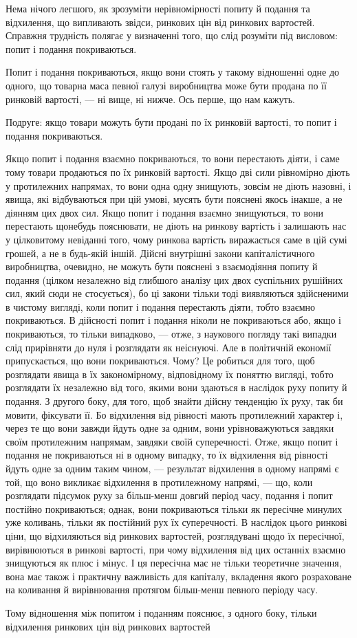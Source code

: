Нема нічого легшого, як зрозуміти нерівномірності попиту
й подання та відхилення, що випливають звідси, ринкових цін
від ринкових вартостей. Справжня трудність полягає у визначенні
того, що слід розуміти під висловом: попит і подання
покриваються.

Попит і подання покриваються, якщо вони стоять у такому
відношенні одне до одного, що товарна маса певної галузі виробництва
може бути продана по її ринковій вартості, — ні вище,
ні нижче. Ось перше, що нам кажуть.

Подруге: якщо товари можуть бути продані по їх ринковій
вартості, то попит і подання покриваються.

Якщо попит і подання взаємно покриваються, то вони перестають
діяти, і саме тому товари продаються по їх ринковій вартості.
Якщо дві сили рівномірно діють у протилежних напрямах,
то вони одна одну знищують, зовсім не діють назовні, і явища,
які відбуваються при цій умові, мусять бути пояснені якось
інакше, а не діянням цих двох сил. Якщо попит і подання взаємно
знищуються, то вони перестають щонебудь пояснювати,
не діють на ринкову вартість і залишають нас у цілковитому
невіданні того, чому ринкова вартість виражається саме в цій
сумі грошей, а не в будь-якій іншій. Дійсні внутрішні закони
капіталістичного виробництва, очевидно, не можуть бути пояснені
з взаємодіяння попиту й подання (цілком незалежно від
глибшого аналізу цих двох суспільних рушійних сил, який сюди
не стосується), бо ці закони тільки тоді виявляються здійсненими
в чистому вигляді, коли попит і подання перестають
діяти, тобто взаємно покриваються. В дійсності попит і подання
ніколи не покриваються або, якщо і покриваються, то тільки
випадково, — отже, з наукового погляду такі випадки слід прирівняти
до нуля і розглядати як неіснуючі. Але в політичній
економії припускається, що вони покриваються. Чому? Це робиться
для того, щоб розглядати явища в їх закономірному, відповідному
їх поняттю вигляді, тобто розглядати їх незалежно від
того, якими вони здаються в наслідок руху попиту й подання.
З другого боку, для того, щоб знайти дійсну тенденцію їх руху, так
би мовити, фіксувати її. Бо відхилення від рівності мають протилежний
характер і, через те що вони завжди йдуть одне за одним,
вони урівноважуються завдяки своїм протилежним напрямам, завдяки
своїй суперечності. Отже, якщо попит і подання не покриваються
ні в одному випадку, то їх відхилення від рівності йдуть одне
за одним таким чином, — результат відхилення в одному напрямі
є той, що воно викликає відхилення в протилежному напрямі, —
що, коли розглядати підсумок руху за більш-менш довгий період
часу, подання і попит постійно покриваються; однак, вони покриваються
тільки як пересічне минулих уже коливань, тільки як
постійний рух їх суперечності. В наслідок цього ринкові ціни,
що відхиляються від ринкових вартостей, розглядувані щодо
їх пересічної, вирівнюються в ринкові вартості, при чому відхилення
від цих останніх взаємно знищуються як плюс і мінус.
І ця пересічна має не тільки теоретичне значення, вона має
також і практичну важливість для капіталу, вкладення якого розраховане
на коливання й вирівнювання протягом більш-менш певного
періоду часу.

\enlargethispage{\baselineskip}

Тому відношення між попитом і поданням пояснює, з одного
боку, тільки відхилення ринкових цін від ринкових вартостей
\parbreak{}  %
